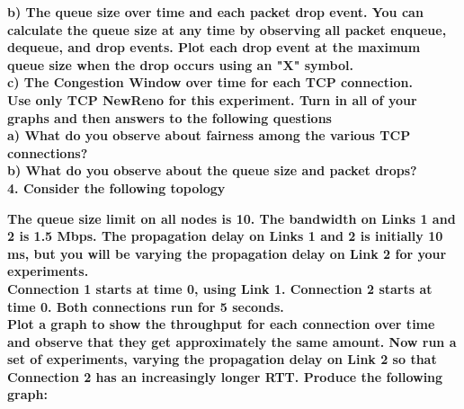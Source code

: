 \documentclass[11pt]{article}
\numberwithin{equation}{section}
\begin{document}
\textbf{b) The queue size over time and each packet drop event. You can calculate the queue size at any time by observing all packet enqueue, dequeue, and drop events. Plot each drop event at the maximum queue size  when the drop occurs using an "X" symbol.}\\

\textbf{c) The Congestion Window over time for each TCP connection.}\\

\textbf{ Use only TCP NewReno for this experiment. Turn in all of your graphs and then answers to the following questions}\\

\textbf{a) What do you observe about fairness among the various TCP connections?}\\
 
\textbf{b) What do you observe about the queue size and packet drops?}\\

\textbf{4. Consider the following topology }\\


\begin{figure}[H]
\begin{center}
		\centering
		\label{fig:q1_f1_a}
\end{center}
\end{figure}

\textbf{The queue size limit on all nodes is 10. The bandwidth on Links 1 and 2 is 1.5 Mbps. The propagation delay on Links 1 and 2 is initially 10 ms, but you will be varying the propagation delay on Link 2 for your experiments.}\\

\textbf{Connection 1 starts at time 0, using Link 1. Connection 2 starts at time 0. Both connections run for 5 seconds.}\\

\textbf{Plot a graph to show the throughput for each connection over time and observe that they get approximately the same amount. Now run a set of experiments, varying the propagation delay on Link 2 so that Connection 2 has an increasingly longer RTT. Produce the following graph:}\\
\end{document}
